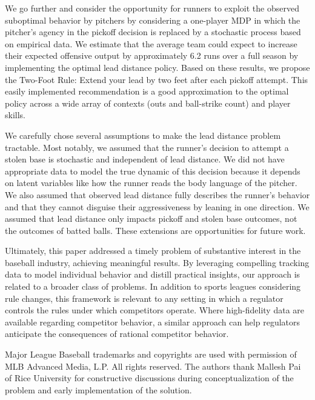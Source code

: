 \documentclass[aoas]{imsart}
\begin{document}
    We go further and consider the opportunity for runners to exploit the observed suboptimal behavior by pitchers by considering a one-player MDP in which the pitcher's agency in the pickoff decision is replaced by a stochastic process based on empirical data. We estimate that the average team could expect to increase their expected offensive output by approximately 6.2 runs over a full season by implementing the optimal lead distance policy. Based on these results, we propose the Two-Foot Rule: Extend your lead by two feet after each pickoff attempt. This easily implemented recommendation is a good approximation to the optimal policy across a wide array of contexts (outs and ball-strike count) and player skills.

    We carefully chose several assumptions to make the lead distance problem tractable. Most notably, we assumed that the runner's decision to attempt a stolen base is stochastic and independent of lead distance. We did not have appropriate data to model the true dynamic of this decision because it depends on latent variables like how the runner reads the body language of the pitcher. We also assumed that observed lead distance fully describes the runner's behavior and that they cannot disguise their aggressiveness by leaning in one direction. We assumed that lead distance only impacts pickoff and stolen base outcomes, not the outcomes of batted balls. These extensions are opportunities for future work.

    Ultimately, this paper addressed a timely problem of substantive interest in the baseball industry, achieving meaningful results. By leveraging compelling tracking data to model individual behavior and distill practical insights, our approach is related to a broader class of problems. In addition to sports leagues considering rule changes, this framework is relevant to any setting in which a regulator controls the rules under which competitors operate. Where high-fidelity data are available regarding competitor behavior, a similar approach can help regulators anticipate the consequences of rational competitor behavior.

\begin{acks}[Acknowledgments]
  Major League Baseball trademarks and copyrights are used with permission of MLB Advanced Media, L.P. All rights reserved. The authors thank Mallesh Pai of Rice University for constructive discussions during conceptualization of the problem and early implementation of the solution.
\end{acks}
\end{document}

